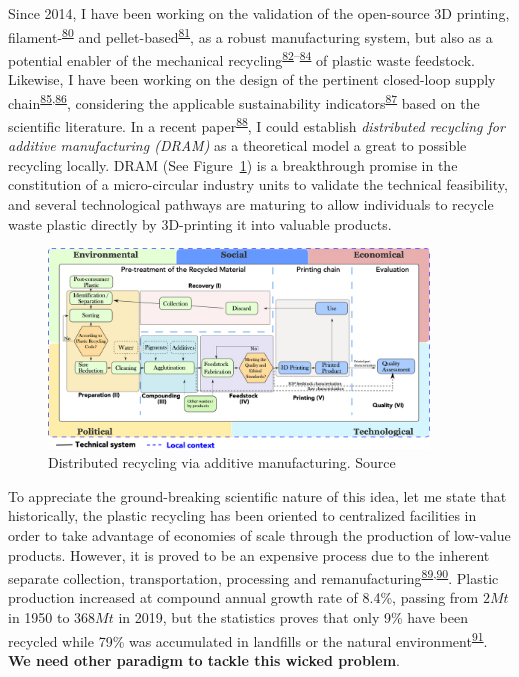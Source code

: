 \documentclass[
  12pt,
  a4paperpaper,
  onecolumn]{article}
\begin{document}
Since 2014, I have been working on the validation of the open-source 3D
printing,
filament-\textsuperscript{\protect\hyperlink{ref-CruzSanchez2014}{80}}
and
pellet-based\textsuperscript{\protect\hyperlink{ref-Arthur2020}{81}}, as
a robust manufacturing system, but also as a potential enabler of the
mechanical
recycling\textsuperscript{\protect\hyperlink{ref-Cruz2015}{82}--\protect\hyperlink{ref-lopez2022}{84}}
of plastic waste feedstock. Likewise, I have been working on the design
of the pertinent closed-loop supply
chain\textsuperscript{\protect\hyperlink{ref-Pavlo2018}{85},\protect\hyperlink{ref-Santander2020}{86}},
considering the applicable sustainability
indicators\textsuperscript{\protect\hyperlink{ref-Santander2022}{87}}
based on the scientific literature. In a recent
paper\textsuperscript{\protect\hyperlink{ref-CruzSanchez2020}{88}}, I
could establish \emph{distributed recycling for additive manufacturing
(DRAM)} as a theoretical model a great to possible recycling locally.
DRAM (See Figure~\ref{fig-DRAM}) is a breakthrough promise in the
constitution of a micro-circular industry units to validate the
technical feasibility, and several technological pathways are maturing
to allow individuals to recycle waste plastic directly by 3D-printing it
into valuable products.

\begin{figure}

{\centering \includegraphics[width=0.9\textwidth,height=\textheight]{Figures/SDRAM-00.png}

}

\caption{\label{fig-DRAM}Distributed recycling via additive
manufacturing. Source}

\end{figure}

To appreciate the ground-breaking scientific nature of this idea, let me
state that historically, the plastic recycling has been oriented to
centralized facilities in order to take advantage of economies of scale
through the production of low-value products. However, it is proved to
be an expensive process due to the inherent separate collection,
transportation, processing and
remanufacturing\textsuperscript{\protect\hyperlink{ref-Hopewell2009}{89},\protect\hyperlink{ref-Singh2017b}{90}}.
Plastic production increased at compound annual growth rate of 8.4\%,
passing from \(2Mt\) in 1950 to \(368Mt\) in 2019, but the statistics
proves that only 9\% have been recycled while 79\% was accumulated in
landfills or the natural
environment\textsuperscript{\protect\hyperlink{ref-Geyer2017}{91}}.
\textbf{We need other paradigm to tackle this wicked problem}.
\end{document}
